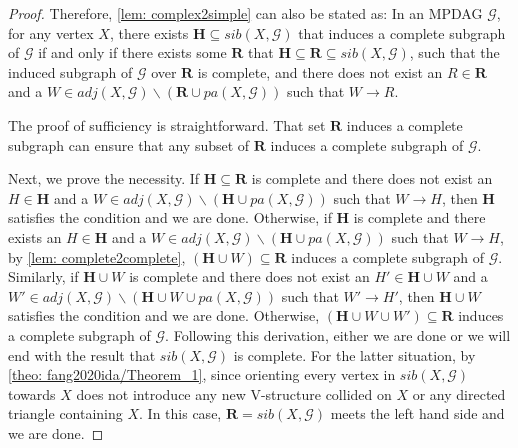 \documentclass{article}
\begin{document}
\begin{proof}
    Therefore, \cref{lem: complex2simple} can also be stated as: In an MPDAG $\mathcal{G}$, for any vertex $X$, there exists $\mathbf{H} \subseteq{sib(X,\mathcal{G})}$ that induces a complete subgraph of $\mathcal{G}$ if and only if there exists some $\mathbf{R}$ that $\mathbf{H} \subseteq \mathbf{R} \subseteq{sib(X,\mathcal{G})}$, such that the induced subgraph of $\mathcal{G}$ over $\mathbf{R}$ is complete, and there does not exist an $R \in \mathbf{R}$ and a $W \in {adj(X,\mathcal{G}) \backslash{(\mathbf{R} \cup pa(X,\mathcal{G}))}}$ such that $W \rightarrow R$.
    
    The proof of sufficiency is straightforward. That set $\mathbf{R}$ induces a complete subgraph can ensure that any subset of $\mathbf{R}$ induces a complete subgraph of $\mathcal{G}$.
    
    Next, we prove the necessity. If $\mathbf{H} \subseteq \mathbf{R}$ is complete and there does not exist an $H \in \mathbf{H}$ and a $W \in {adj(X,\mathcal{G}) \backslash{(\mathbf{H} \cup pa(X,\mathcal{G}))}}$ such that $W \rightarrow H$, then $\mathbf{H}$ satisfies the condition and we are done. Otherwise, if $\mathbf{H}$ is complete and there exists an $H \in \mathbf{H}$ and a $W \in {adj(X,\mathcal{G}) \backslash{(\mathbf{H} \cup pa(X,\mathcal{G}))}}$ such that $W \rightarrow H$, by \cref{lem: complete2complete}, $(\mathbf{H} \cup W) \subseteq \mathbf{R}$ induces a complete subgraph of $\mathcal{G}$. Similarly, if $\mathbf{H} \cup W$ is complete and there does not exist an $H' \in \mathbf{H} \cup W$ and a $W' \in {adj(X,\mathcal{G}) \backslash{(\mathbf{H} \cup W \cup pa(X,\mathcal{G}))}}$ such that $W' \rightarrow H'$, then $\mathbf{H} \cup W$ satisfies the condition and we are done. Otherwise, $(\mathbf{H} \cup W \cup W') \subseteq \mathbf{R}$ induces a complete subgraph of $\mathcal{G}$. Following this derivation, either we are done or we will end with the result that $sib(X,\mathcal{G})$ is complete. For the latter situation, by \cref{theo: fang2020ida/Theorem_1}, since orienting every vertex in $sib(X,\mathcal{G})$ towards $X$ does not introduce any new V-structure collided on $X$ or any directed triangle containing $X$. In this case, $\mathbf{R}=sib(X,\mathcal{G})$ meets the left hand side and we are done.
\end{proof}
\end{document}
